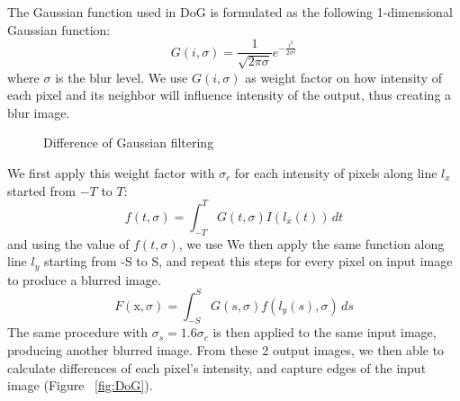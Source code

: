 The Gaussian function used in DoG is formulated as the following 1-dimensional Gaussian function:
\begin{equation}
	G(i, \sigma) = \frac{1}{\sqrt{2\pi\sigma}}e^{-\frac{i^2}{2\sigma^2}}
\end{equation}
where $\sigma$ is the blur level. We use $G(i, \sigma)$ as weight factor on how intensity of each pixel and its neighbor will influence intensity of the output, thus creating a blur image. 

\begin{figure}[H]
	\centering
	\caption{Difference of Gaussian filtering}\label{fig:image}
\end{figure}

We first apply this weight factor with $\sigma_{c}$ for each intensity of pixels along line $l_{x}$ started from $-T$ to $T$:
\begin{equation}
	f(t, \sigma)=\int_{-T}^{T}G(t, \sigma)I(l_{x}(t))\,dt
\end{equation}
and using the value of $f(t, \sigma)$, we use 
We then apply the same function along line $l_{y}$ starting from -S to S, and repeat this steps for every pixel on input image to produce a blurred image.
\begin{equation}
	F(\mbox{x}, \sigma)=
		\int_{-S}^{S}G(s, \sigma)f(l_{y}(s), \sigma)\,ds
\end{equation}
The same procedure with $\sigma_{s} = 1.6\sigma_{c}$ is then applied to the same input image, producing another blurred image.
From these 2 output images, we then able to calculate differences of each pixel's intensity, and capture edges of the input image (Figure ~\ref{fig:DoG}).

